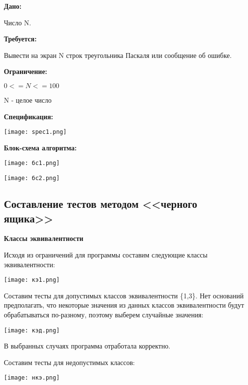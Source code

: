 \documentclass[12pt]{article}
\begin{document}
{\bf Дано:}

Число N.

{\bf Требуется:}

Вывести на экран N строк треугольника Паскаля или сообщение об ошибке.

{\bf Ограничение:}

$ 0<=N<=100 $

N - целое число

{\bf Спецификация:}

\vskip 1cm
{
    \centering
    \texttt{[image: spec1.png]}
   
    \label{fig:i1}
}
\vskip 1cm


{\bf Блок-схема алгоритма:}

\vskip 1cm
{
    \centering
    \texttt{[image: бс1.png]}
   
    \label{fig:i1}
}
\vskip 1cm


\vskip 1cm
{
    \centering
    \texttt{[image: бс2.png]}
   
    \label{fig:i1}
}
\vskip 1cm


\subsection{Составление тестов методом <<черного ящика>>}

{\bf Классы эквивалентности}

Исходя из ограничений для программы составим следующие классы эквивалентности:

\vskip 1cm
{
    \centering
    \texttt{[image: кэ1.png]}
   
    \label{fig:i1}
}
\vskip 1cm


Составим тесты для допустимых классов эквивалентности \{1,3\}. Нет оснований предполагать, что некоторые значения из данных классов эквивалентности будут обрабатываться по-разному, поэтому выберем случайные значения:

\vskip 1cm
{
    \centering
    \texttt{[image: кэд.png]}
   
    \label{fig:i1}
}
\vskip 1cm



В выбранных случаях программа отработала корректно.


Составим тесты для недопустимых классов:

\vskip 1cm
{
    \centering
    \texttt{[image: нкэ.png]}
   
    \label{fig:i1}
}
\vskip 1cm
\end{document}
